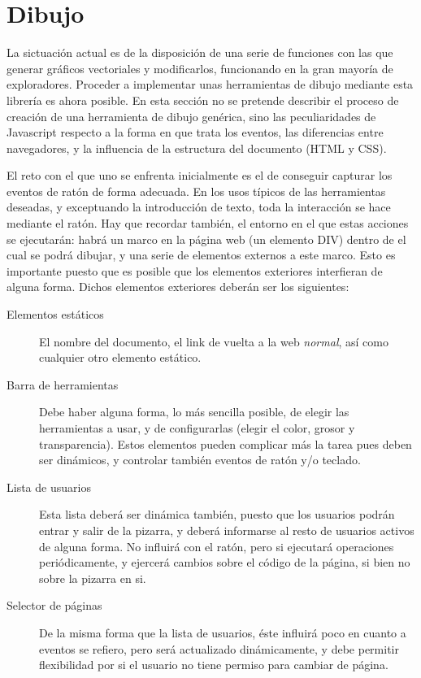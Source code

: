 \section{Dibujo} %
\label{sec:javascript_dibujo}
La sictuación actual es de la disposición de una serie de funciones con las que generar gráficos vectoriales y modificarlos, funcionando en la gran mayoría de exploradores. Proceder a implementar unas herramientas de dibujo mediante esta librería es ahora posible. En esta sección no se pretende describir el proceso de creación de una herramienta de dibujo genérica, sino las peculiaridades de Javascript respecto a la forma en que trata los eventos, las diferencias entre navegadores, y la influencia de la estructura del documento (HTML y CSS).

El reto con el que uno se enfrenta inicialmente es el de conseguir capturar los eventos de ratón de forma adecuada. En los usos típicos de las herramientas deseadas, y exceptuando la introducción de texto, toda la interacción se hace mediante el ratón. Hay que recordar también, el entorno en el que estas acciones se ejecutarán: habrá un marco en la página web (un elemento DIV) dentro de el cual se podrá dibujar, y una serie de elementos externos a este marco. Esto es importante puesto que es posible que los elementos exteriores interfieran de alguna forma. Dichos elementos exteriores deberán ser los siguientes:

\begin{description}
  \item[Elementos estáticos] El nombre del documento, el link de vuelta a la web \emph{normal}, así como cualquier otro elemento estático.
  \item[Barra de herramientas] Debe haber alguna forma, lo más sencilla posible, de elegir las herramientas a usar, y de configurarlas (elegir el color, grosor y transparencia). Estos elementos pueden complicar más la tarea pues deben ser dinámicos, y controlar también eventos de ratón y/o teclado.
  \item[Lista de usuarios] Esta lista deberá ser dinámica también, puesto que los usuarios podrán entrar y salir de la pizarra, y deberá informarse al resto de usuarios activos de alguna forma. No influirá con el ratón, pero si ejecutará operaciones periódicamente, y ejercerá cambios sobre el código de la página, si bien no sobre la pizarra en si.  
  \item[Selector de páginas] De la misma forma que la lista de usuarios, éste influirá poco en cuanto a eventos se refiero, pero será actualizado dinámicamente, y debe permitir flexibilidad por si el usuario no tiene permiso para cambiar de página.
\end{description}

